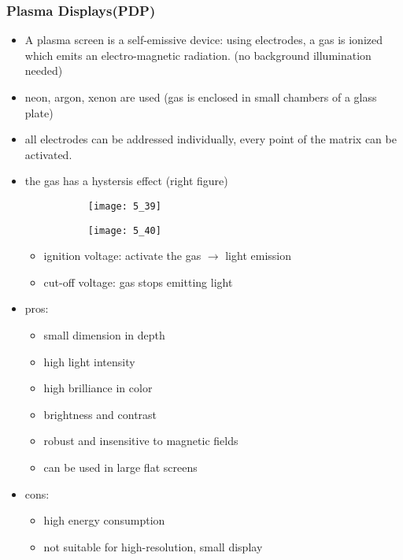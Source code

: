 \documentclass{standalone}
\begin{document}
\subsubsection*{Plasma Displays(PDP)}
\begin{itemize}
\item A plasma screen is a self-emissive device: using electrodes, a gas is ionized which emits an electro-magnetic radiation. (no background illumination needed)
\item neon, argon, xenon are used (gas is enclosed in small chambers of a glass plate)
\item all electrodes can be addressed individually, every point of the matrix can be activated.
\item the gas has a hystersis effect (right figure)
	\begin{figure}[H]
		\begin{subfigure}[b]{0.45\textwidth}
			\texttt{[image: 5\_39]}
		\end{subfigure}
		\begin{subfigure}[b]{0.45\textwidth}
			\texttt{[image: 5\_40]}
		\end{subfigure}
	\end{figure}
	
	\begin{itemize}
		\item ignition voltage: activate the gas $\rightarrow$ light emission
		\item cut-off voltage: gas stops emitting light
	\end{itemize}
\item pros:
	\begin{itemize}
		\item small dimension in depth
		\item high light intensity
		\item high brilliance in color
		\item brightness and contrast
		\item robust and insensitive to magnetic fields
		\item can be used in large flat screens
	\end{itemize} 
\item cons:
	\begin{itemize}
		\item high energy consumption 
		\item not suitable for high-resolution, small display
	\end{itemize}
\end{itemize}
\end{document}
